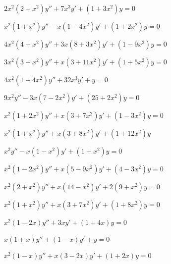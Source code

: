 \begin{exerciselist}
\item\label{exer:7.6.32}$2x^2(2+x^2)y''+7x^3y'+(1+3x^2)y=0$

\item\label{exer:7.6.33}$x^2(1+x^2)y''-x(1-4x^2)y'+(1+2x^2)y=0$

\item\label{exer:7.6.34}$4x^2(4+x^2)y''+3x(8+3x^2)y'+(1-9x^2)y=0$

\item\label{exer:7.6.35}$3x^2(3+x^2)y''+x(3+11x^2)y'+(1+5x^2)y=0$

\item\label{exer:7.6.36}$4x^2(1+4x^2)y''+32x^3y'+y=0$

\item\label{exer:7.6.37}$9x^2y''-3x(7-2x^2)y'+(25+2x^2)y=0$

\item\label{exer:7.6.38}$x^2(1+2x^2)y''+x(3+7x^2)y'+(1-3x^2)y=0$


\item\label{exer:7.6.39}\Cex
$x^2(1+x^2)y''+x(3+8x^2)y'+(1+12x^2)y$

\item\label{exer:7.6.40}\Cex
$x^2y''-x(1-x^2)y'+(1+x^2)y=0$

\item\label{exer:7.6.41}\Cex
$x^2(1-2x^2)y''+x(5-9x^2)y'+(4-3x^2)y=0$

\item\label{exer:7.6.42}\Cex
$x^2(2+x^2)y''+x(14-x^2)y'+2(9+x^2)y=0$

\item\label{exer:7.6.43}\Cex
$x^2(1+x^2)y''+x(3+7x^2)y'+(1+8x^2)y=0$


\item\label{exer:7.6.44}$x^2(1-2x)y''+3xy'+(1+4x)y=0$

\item\label{exer:7.6.45}$x(1+x)y''+(1-x)y'+y=0$

\item\label{exer:7.6.46}$x^2(1-x)y''+x(3-2x)y'+(1+2x)y=0$


\end{exerciselist}
